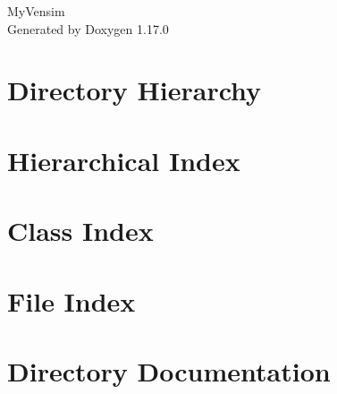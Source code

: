 \documentclass[twoside]{book}
\newcommand{\+}{\discretionary{\mbox{\scriptsize$\hookleftarrow$}}{}{}}
\newcommand{\clearemptydoublepage}{%
    \newpage{\pagestyle{empty}\cleardoublepage}%
  }
\begin{document}
  \raggedbottom
    \hypersetup{pageanchor=false,
                bookmarksnumbered=true,
                pdfencoding=unicode
               }
  \begin{titlepage}
  \vspace*{7cm}
  \begin{center}%
  {\Large My\+Vensim}\\
  \vspace*{1cm}
  {\large Generated by Doxygen 1.17.0}\\
  \end{center}
  \end{titlepage}
  \clearemptydoublepage
  \tableofcontents
  \clearemptydoublepage
  \hypersetup{pageanchor=true}
\chapter{Directory Hierarchy}

\chapter{Hierarchical Index}

\chapter{Class Index}

\chapter{File Index}

\chapter{Directory Documentation}






















\end{document}
